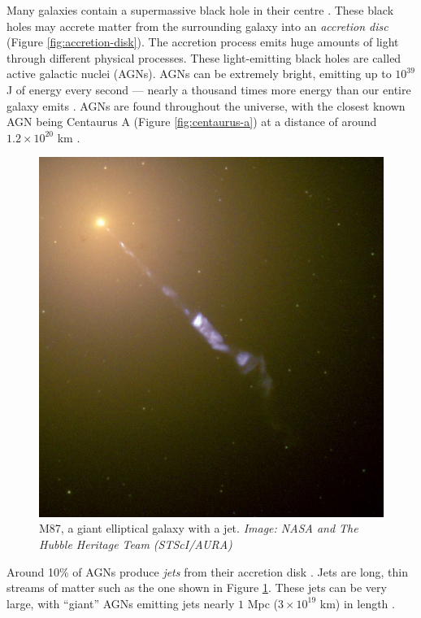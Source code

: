         Many galaxies contain a supermassive black hole in their centre
        \citep{richstone98}. These black holes may accrete matter from the
        surrounding galaxy into an \emph{accretion disc} (Figure
        \ref{fig:accretion-disk}). The accretion process emits huge amounts of
        light through different physical processes. These light-emitting black
        holes are called active galactic nuclei (AGNs). AGNs can be extremely
        bright, emitting up to $10^{39}$ J of energy every second --- nearly a
        thousand times more energy than our entire galaxy emits
        \citep{begelman84}. AGNs are found throughout the universe, with the
        closest known AGN being Centaurus A (Figure \ref{fig:centaurus-a}) at a
        distance of around $1.2 \times 10^{20}$ km \citep{harris10}.

        \begin{figure}
            \centering
            \includegraphics[height=0.3\textheight]{images/M87_jet.jpg}
            \caption{M87, a giant elliptical galaxy with a jet. \emph{Image:
                NASA and The Hubble Heritage Team (STScI/AURA)}}
            \label{fig:m87}
        \end{figure}

        Around 10\% of AGNs produce \emph{jets} from their accretion disk
        \citep{fabian99}. Jets are long, thin streams of matter such as the one
        shown in Figure \ref{fig:m87}. These jets can be very large, with
        ``giant'' AGNs emitting jets nearly $1$ Mpc ($3 \times 10^{19}$ km) in
        length \citep{saripalli05}.

